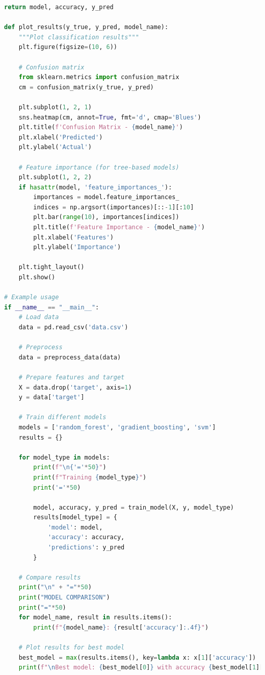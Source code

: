 \begin{lstlisting}[language=Python, caption={Пример алгоритма машинного обучения}, label={lst:ml_algorithm}, style=breakable]
    return model, accuracy, y_pred

def plot_results(y_true, y_pred, model_name):
    """Plot classification results"""
    plt.figure(figsize=(10, 6))
    
    # Confusion matrix
    from sklearn.metrics import confusion_matrix
    cm = confusion_matrix(y_true, y_pred)
    
    plt.subplot(1, 2, 1)
    sns.heatmap(cm, annot=True, fmt='d', cmap='Blues')
    plt.title(f'Confusion Matrix - {model_name}')
    plt.xlabel('Predicted')
    plt.ylabel('Actual')
    
    # Feature importance (for tree-based models)
    plt.subplot(1, 2, 2)
    if hasattr(model, 'feature_importances_'):
        importances = model.feature_importances_
        indices = np.argsort(importances)[::-1][:10]
        plt.bar(range(10), importances[indices])
        plt.title(f'Feature Importance - {model_name}')
        plt.xlabel('Features')
        plt.ylabel('Importance')
    
    plt.tight_layout()
    plt.show()

# Example usage
if __name__ == "__main__":
    # Load data
    data = pd.read_csv('data.csv')
    
    # Preprocess
    data = preprocess_data(data)
    
    # Prepare features and target
    X = data.drop('target', axis=1)
    y = data['target']
    
    # Train different models
    models = ['random_forest', 'gradient_boosting', 'svm']
    results = {}
    
    for model_type in models:
        print(f"\n{'='*50}")
        print(f"Training {model_type}")
        print('='*50)
        
        model, accuracy, y_pred = train_model(X, y, model_type)
        results[model_type] = {
            'model': model,
            'accuracy': accuracy,
            'predictions': y_pred
        }
    
    # Compare results
    print("\n" + "="*50)
    print("MODEL COMPARISON")
    print("="*50)
    for model_name, result in results.items():
        print(f"{model_name}: {result['accuracy']:.4f}")
    
    # Plot results for best model
    best_model = max(results.items(), key=lambda x: x[1]['accuracy'])
    print(f"\nBest model: {best_model[0]} with accuracy {best_model[1]['accuracy']:.4f}")
\end{lstlisting}

